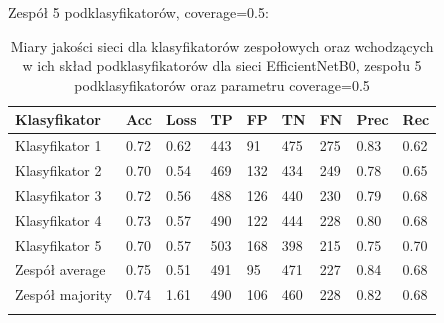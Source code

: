 \documentclass[polish,12pt]{aghthesis}
\begin{document}
\vspace{3mm}
\noindent Zespół 5 podklasyfikatorów, coverage=0.5:
\renewcommand{\arraystretch}{1.75}
 \begin{longtable}[h!]{|m{2.6cm}|m{1.2cm}|m{1.2cm}|m{1.2cm}|m{1.2cm}|m{1.2cm}|m{1.2cm}|m{1.2cm}|m{1.2cm}|}
 \hline
 Klasyfikator & Acc & Loss & TP & FP & TN & FN & Prec & Rec\\
 \hline
 Klasyfikator 1 & 0.72 & 0.62 & 443 & 91 & 475 & 275 & 0.83 & 0.62\\
 \hline
 Klasyfikator 2 & 0.70 & 0.54 & 469 & 132 & 434 & 249 & 0.78 & 0.65\\
 \hline
 Klasyfikator 3 & 0.72 & 0.56 & 488 & 126 & 440 & 230 & 0.79 & 0.68\\
 \hline
 Klasyfikator 4 & 0.73 & 0.57 & 490 & 122 & 444 & 228 & 0.80 & 0.68\\
 \hline
 Klasyfikator 5 & 0.70 & 0.57 & 503 & 168 & 398 & 215 & 0.75 & 0.70\\
 \hline
 Zespół average & 0.75 & 0.51 & 491 & 95 & 471 & 227 & 0.84 & 0.68\\ 
 \hline
 Zespół \newline majority & 0.74 & 1.61 & 490 & 106 & 460 & 228 & 0.82 & 0.68\\
 \hline
\caption{Miary jakości sieci dla klasyfikatorów zespołowych oraz wchodzących w ich skład podklasyfikatorów dla sieci EfficientNetB0, zespołu 5 podklasyfikatorów oraz parametru coverage=0.5}
\label{table:33}
\end{longtable}
\end{document}
